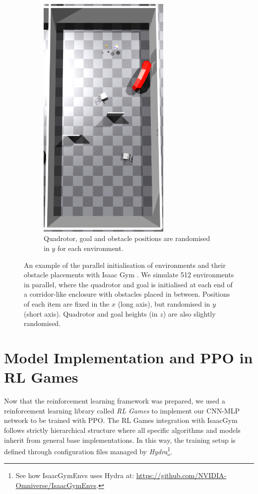 \begin{figure}[hbt]
\begin{subfigure}[b]{0.3\textwidth}
        \includegraphics[width=0.7\textwidth]{figures/6_/6_n_obst_env.png}
        \caption{Quadrotor, goal and obstacle positions are randomised in $y$ for each environment.}
        \label{fig:6_n_obst_env}
    \end{subfigure}
    \caption{An example of the parallel initialisation of environments and their obstacle placements with Isaac Gym \cite{IsaacGym}. We simulate 512 environments in parallel, where the quadrotor and goal is initialised at each end of a corridor-like enclosure with obstacles placed in between. Positions of each item are fixed in the $x$ (long axis), but randomised in $y$ (short axis). Quadrotor and goal heights (in $z$) are also slightly randomised.}
    \label{fig:6_env_init}
\end{figure}


\section{Model Implementation and PPO in RL Games}
Now that the reinforcement learning framework was prepared, we used a reinforcement learning library called \textit{RL Games} \cite{rl-games2022} to implement our CNN-MLP network to be trained with PPO.
The RL Games integration with IsaacGym follows strictly hierarchical structure where all specific algorithms and models inherit from general base implementations. In this way, the training setup is defined through configuration files managed by \textit{Hydra}\footnote{See how IsaacGymEnvs uses Hydra at: \url{https://github.com/NVIDIA-Omniverse/IsaacGymEnvs}.}. 

